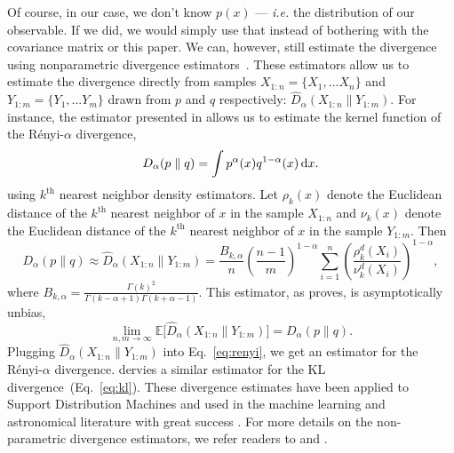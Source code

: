 \documentclass[12pt, letterpaper, preprint]{aastex}
\newcommand{\beq}{\begin{equation}}
\newcommand{\eeq}{\end{equation}}
\begin{document}
Of course, in our case, we don't know $p(x)$ --- \emph{i.e.} the distribution of
our observable. If we did, we would simply use that instead of bothering with 
the covariance matrix or this paper. We can, however, still estimate the 
divergence using nonparametric divergence estimators~\citep{wang2009, poczos2012, krishnamurthy2014}. 
These estimators allow us to estimate the divergence directly from 
samples $X_{1:n} = \{ X_1, ... X_n \}$ and $Y_{1:m} = \{ Y_1, ... Y_m \}$ 
drawn from $p$ and $q$ respectively: $\hat{D}_{\alpha}(X_{1:n} \parallel Y_{1:m})$. 
For instance, the estimator presented in \cite{poczos2012} allows us to estimate 
the kernel function of the R\'enyi-$\alpha$ divergence,
\beq \label{eq:d_alpha}
D_{\alpha} ( p \parallel q ) = \int p^\alpha(x) q^{1-\alpha}(x)\,{\rm d}x. 
\eeq
using $k^\mathrm{th}$ nearest neighbor density estimators. Let $\rho_k(x)$ 
denote the Euclidean distance of the $k^\mathrm{th}$ nearest neighbor 
of $x$ in the sample $X_{1:n}$ and $\nu_k(x)$ denote the Euclidean distance 
of the $k^\mathrm{th}$ nearest neighbor of $x$ in the sample $Y_{1:m}$. Then 
\beq \label{eq:d_alpha_est}
D_{\alpha}(p \parallel q) \approx \hat{D}_{\alpha}(X_{1:n} \parallel Y_{1:m}) = \frac{B_{k,\alpha}}{n} \left(\frac{n-1}{m}\right)^{1-\alpha}
\sum\limits_{i=1}^{n} \left(\frac{\rho_k^{d}(X_i)}{\nu_k^{d}(X_i)} \right)^{1-\alpha},
\eeq
where $B_{k, \alpha} = \frac{\Gamma(k)^2}{\Gamma(k-\alpha+1)\Gamma(k+\alpha-1)}$. 
This estimator, as \cite{poczos2012} proves, is asymptotically unbias,
\beq
\lim_{n, m \rightarrow \infty} \mathbb{E} \big[ \hat{D}_{\alpha} (X_{1:n} \parallel Y_{1:m}) \big] = D_{\alpha} (p \parallel q).
\eeq
Plugging $\hat{D}_{\alpha}(X_{1:n} \parallel Y_{1:m})$ into Eq.~\ref{eq:renyi},
we get an estimator for the R\'enyi-$\alpha$ divergence. \cite{wang2009} dervies
a similar estimator for the KL divergence~(Eq.~\ref{eq:kl}). 
These divergence estimates have been applied to Support Distribution Machines 
and used in the machine learning and astronomical literature with great success
\citep[\emph{e.g.}][]{poczos2011, poczos2012, poczos2012a, poczos2012b, xu2013, ntampaka2015, ntampaka2016, ravanbakhsh2017a}.
For more details on the non-parametric divergence estimators, we refer readers to 
\cite{poczos2012} and \cite{krishnamurthy2014}.
\end{document}
